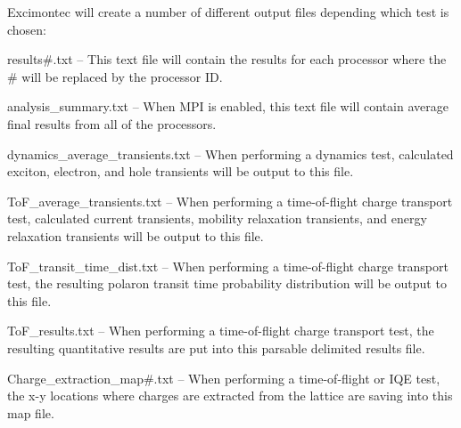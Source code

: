 Excimontec will create a number of different output files depending which test is chosen\+:
\begin{DoxyItemize}
\item results\#.txt -- This text file will contain the results for each processor where the \# will be replaced by the processor ID.
\item analysis\+\_\+summary.\+txt -- When M\+PI is enabled, this text file will contain average final results from all of the processors.
\item dynamics\+\_\+average\+\_\+transients.\+txt -- When performing a dynamics test, calculated exciton, electron, and hole transients will be output to this file.
\item To\+F\+\_\+average\+\_\+transients.\+txt -- When performing a time-\/of-\/flight charge transport test, calculated current transients, mobility relaxation transients, and energy relaxation transients will be output to this file.
\item To\+F\+\_\+transit\+\_\+time\+\_\+dist.\+txt -- When performing a time-\/of-\/flight charge transport test, the resulting polaron transit time probability distribution will be output to this file.
\item To\+F\+\_\+results.\+txt -- When performing a time-\/of-\/flight charge transport test, the resulting quantitative results are put into this parsable delimited results file.
\item Charge\+\_\+extraction\+\_\+map\#.txt -- When performing a time-\/of-\/flight or I\+QE test, the x-\/y locations where charges are extracted from the lattice are saving into this map file. 
\end{DoxyItemize}